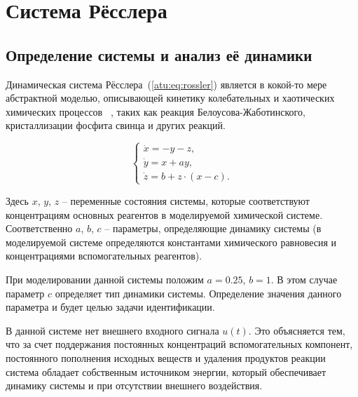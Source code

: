 
\FloatBarrier
\section{Система Рёсслера} %
\label{atu:sect:ross}


\subsection{Определение системы и анализ её динамики} %

Динамическая система Рёсслера~(\ref{atu:eq:rossler})
является в кокой-то мере абстрактной моделью,
описывающей кинетику колебательных и хаотических химических процессов
~\cite{ROSSLER1976397,neimark_stoch_chaos_vibro,koltsova_nl_dyn_chem,berje_order_in_chaos,chulichkcov_mm_ml_dyn,puhov_ur_reaction_diffusion},
таких как реакция Белоусова-Жаботинского, кристаллизации фосфита свинца и других реакций.


\begin{equation}
\begin{cases}
  \dot{x}  = -y - z  ,  \\
  \dot{y}  = x + a y ,\\
  \dot{z}  = b + z \cdot ( x-c ) .
\end{cases}
\label{atu:eq:rossler}
\end{equation}

Здесь \(x\), \(y\), \(z\) -- переменные состояния системы,
которые соответствуют концентрациям основных реагентов
в моделируемой химической системе.
Соответственно \(a\), \(b\), \(c\) --
параметры, определяющие динамику системы
(в моделируемой системе определяются константами химического равновесия
и концентрациями вспомогательных реагентов).

При моделировании данной системы положим
\(a=0.25\), \(b=1\).
В этом случае параметр \(c\) определяет
тип динамики системы.
Определение значения данного параметра и будет
целью задачи идентификации.

В данной системе нет внешнего входного сигнала \( u(t) \).
Это объясняется тем, что за счет
поддержания постоянных концентраций вспомогательных
компонент, постоянного пополнения исходных веществ
и удаления продуктов реакции система обладает
собственным источником энергии, который обеспечивает
динамику системы и при отсутствии
внешнего воздействия.

